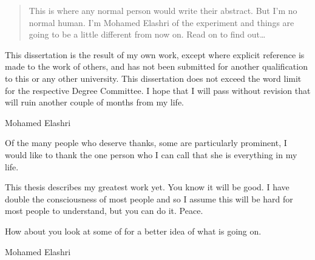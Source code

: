 
\begin{abstract}%
This is where any normal person would write their abstract. But I'm no normal human. I'm Mohamed Elashri of the \nova experiment and things are going to be a little different from now on. Read on to find out\dots
\end{abstract}


\begin{declaration}
  This dissertation is the result of my own work, except where explicit
  reference is made to the work of others, and has not been submitted
  for another qualification to this or any other university. This
  dissertation does not exceed the word limit for the respective Degree
  Committee. I hope that I will pass without revision that will ruin another couple of months from my life. 
  \vspace*{1cm}
  \begin{flushright}
    Mohamed Elashri
  \end{flushright}
\end{declaration}


\begin{acknowledgements}
  Of the many people who deserve thanks, some are particularly prominent, I would like to thank the one person who I can call that she is everything in my life. \end{acknowledgements}


\begin{preface}
  This thesis describes my greatest work yet. You know it will be good. I have double the consciousness of most people \cite{ciccariello2009critique} and so I assume this will be hard for most people to understand, but you can do it. Peace. 

  \noindent
  How about you look at some of  for a better idea of what is going on.
\end{preface}

\tableofcontents


%
  {Mohamed Elashri}
\thispagestyle{empty}
